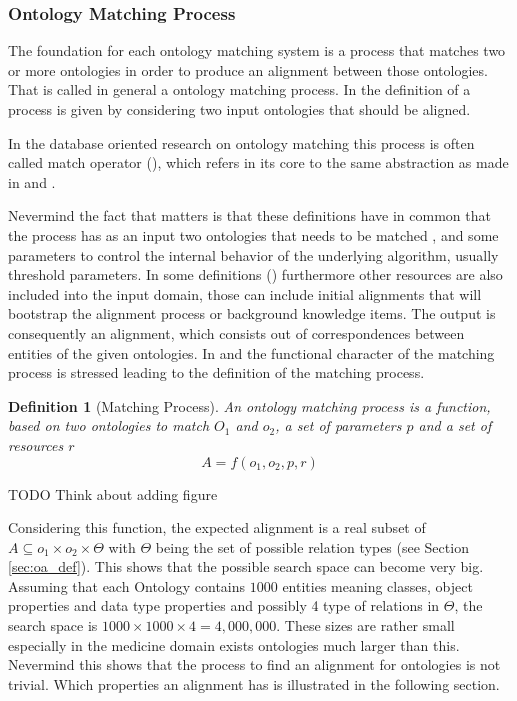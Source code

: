 \documentclass[11pt,titlepage,oneside,openany,a4paper]{report}
\newtheorem{definition}{Definition}[chapter]
\begin{document}
\subsubsection{Ontology Matching Process}
\label{sec:om_process}
The foundation for each ontology matching system is a process that matches two or more ontologies in order to produce an alignment between those ontologies. That is called in general a ontology matching process. In the definition of a process is given by considering two input ontologies that should be aligned.

In the database oriented research on ontology matching this process is often called match operator (\cite{Rahm:2001}), which refers in its core to the same abstraction as made in \cite{euzenat2013d} and  \cite{ehrig2006ontology}.

Nevermind the fact that matters is that these definitions have in common that the process has as an input two ontologies that needs to be matched , and some parameters to control the internal behavior of the underlying algorithm, usually threshold parameters. In some definitions (\cite{euzenat2004api}) furthermore other resources are also included into the input domain, those can include initial alignments that will bootstrap the alignment process or background knowledge items. The output is consequently an alignment, which consists out of correspondences between entities of the given ontologies. In \cite{euzenat2013d} and  \cite{ehrig2006ontology} the functional character of the matching process is stressed leading to the definition of the matching process.

\begin{definition} [Matching Process]
An ontology matching process is a function, based on two ontologies to match $O_1$ and $o_2$, a set of parameters $p$ and  a set of resources $r$
\begin{equation*}
A = f (o_1, o_2, p,r)
\end{equation*}
\end{definition}

\begin{LARGE}
TODO Think about adding figure
\end{LARGE}

Considering this function, the expected alignment is a real subset of $ A \subseteq o_1 \times o_2 \times \Theta$ with $\Theta$ being the set of possible relation types (see Section \ref{sec:oa_def}). This shows that the possible search space can become very big. Assuming that each Ontology contains $1000$ entities meaning classes, object properties and data type properties and possibly 4 type of relations in $\Theta$, the  search space is $1000 \times 1000 \times 4 = 4,000,000$. These sizes are rather small especially in the medicine domain exists ontologies much larger than this.  Nevermind this shows that the process to find an alignment for ontologies is not trivial. \cite{ehrig2006ontology}
Which properties an alignment has is illustrated in the following section.
\end{document}
